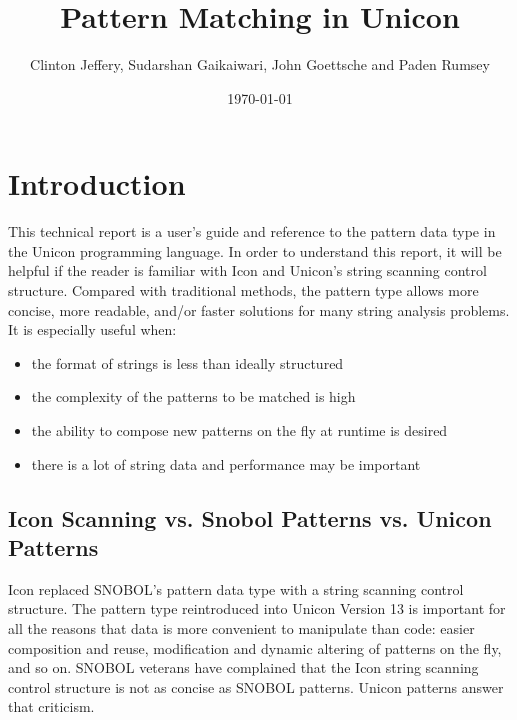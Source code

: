 \documentclass[letterpaper,12pt]{article}
\title{Pattern Matching in Unicon}
\author{Clinton Jeffery, Sudarshan Gaikaiwari, \linebreak John Goettsche and Paden Rumsey}
\date{\today}
\begin{document}


\maketitle


\section{Introduction}

This technical report is a user's guide and reference to the pattern
data type in the Unicon programming language. In order to understand
this report, it will be helpful if the reader is familiar with Icon
and Unicon's string scanning control structure. Compared with
traditional methods, the pattern type allows more concise, more
readable, and/or faster solutions for many string analysis problems.
It is especially useful when:

\begin{itemize}
\item the format of strings is less than ideally structured
\item the complexity of the patterns to be matched is high
\item the ability to compose new patterns on the fly at runtime is
desired
\item there is a lot of string data and performance may be important
\end{itemize}

\subsection{Icon Scanning vs. Snobol Patterns vs. Unicon Patterns}

Icon replaced SNOBOL's pattern data type with a
string scanning control structure.  The pattern type reintroduced
into Unicon Version 13 is important for all the reasons that data
is more convenient to manipulate than code: easier composition and
reuse, modification and dynamic altering of patterns on the fly, and
so on. SNOBOL veterans have complained that the Icon string
scanning control structure is not as concise as SNOBOL patterns.
Unicon patterns answer that criticism.
\end{document}
